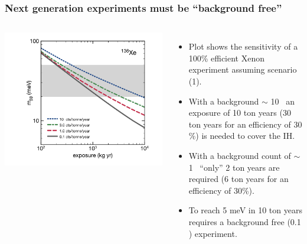 \begin{frame}
\frametitle{Next generation experiments must be ``background free''}

\begin{columns}
 
\includegraphics[scale=0.35]{moriond/xenon_bkg.png}
 
\begin{itemize}
\item Plot shows the sensitivity of a 100\% efficient Xenon experiment assuming scenario (1).
\item With a background $\sim$ 10 \ckky\ an exposure of 10 ton years  (30 ton years for an efficiency of 30 \%) is needed to cover the IH.
\item With a background count of  $\sim$ 1 \ckky\, ``only'' 2 ton years are required (6 ton years for an efficiency of 30\%).
\item To reach 5 meV in 10 ton years requires a background free (0.1 \ckky) experiment. 
\end{itemize}
\end{columns}
\end{frame}

 





